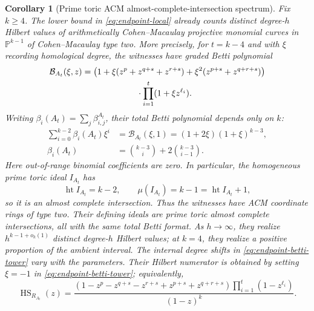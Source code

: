 \documentclass[11pt,reqno]{amsart}
\newtheorem{corollary}[theorem]{Corollary}
\theoremstyle{definition}
\theoremstyle{remark}
\newcommand{\HS}{\operatorname{HS}}
\begin{document}
\begin{corollary}[Prime toric ACM almost-complete-intersection spectrum]
\label{cor:endpoint-acm-type-two}
Fix $k\geq4$.  The lower bound in \eqref{eq:endpoint-local} already counts
distinct degree-$h$ Hilbert values of arithmetically Cohen--Macaulay
projective monomial curves in $\mathbb P^{k-1}$ of Cohen--Macaulay type two.
More precisely, for $t=k-4$ and with $\xi$ recording homological degree, the
witnesses have graded Betti polynomial
\begin{equation}\label{eq:endpoint-betti-tower}
 \begin{split}
 \mathcal B_{A_t}(\xi,z)
 ={}&\bigl(
  1+\xi(z^p+z^{q+s}+z^{r+s})
  +\xi^2(z^{p+s}+z^{q+r+s})
 \bigr)\\
 &\hspace{18mm}\cdot
 \prod_{i=1}^t(1+\xi z^{\ell_i}).
 \end{split}
\end{equation}
Writing $\beta_i(A_t)=\sum_j\beta^{A_t}_{i,j}$, their total Betti polynomial
depends only on $k$:
\begin{equation}\label{eq:endpoint-total-Betti}
 \begin{aligned}
  \sum_{i=0}^{k-2}\beta_i(A_t)\xi^i
  &=\mathcal B_{A_t}(\xi,1)=(1+2\xi)(1+\xi)^{k-3},\\
  \beta_i(A_t)&=\binom{k-3}{i}+2\binom{k-3}{i-1}.
 \end{aligned}
\end{equation}
Here out-of-range binomial coefficients are zero.  In particular, the
homogeneous prime toric ideal $I_{A_t}$ has
\[
 \operatorname{ht}I_{A_t}=k-2,
 \qquad
 \mu(I_{A_t})=k-1=\operatorname{ht}I_{A_t}+1,
\]
so it is an almost complete intersection.  Thus the witnesses have ACM
coordinate rings of type two.  Their defining ideals are prime toric almost
complete intersections, all with the same total Betti format.  As
$h\to\infty$, they realize $h^{k-1+o_k(1)}$ distinct degree-$h$ Hilbert
values; at $k=4$, they realize a positive proportion of the ambient interval.
The internal degree shifts in
\eqref{eq:endpoint-betti-tower} vary with the parameters.
Their Hilbert numerator is obtained by setting $\xi=-1$ in
\eqref{eq:endpoint-betti-tower}; equivalently,
\begin{equation}\label{eq:endpoint-Hilbert-numerator-tower}
 \HS_{R_{A_t}}(z)=
 \frac{
  (1-z^p-z^{q+s}-z^{r+s}+z^{p+s}+z^{q+r+s})
  \prod_{i=1}^t(1-z^{\ell_i})}
 {(1-z)^k}.
\end{equation}
\end{corollary}
\end{document}
